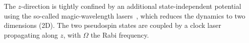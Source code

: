 \documentclass[twocolumn,english,prl,floatfix,citeautoscript,nofootinbib]{revtex4}
\begin{document}
The $z$-direction is tightly confined by an additional state-independent
potential using the so-called magic-wavelength lasers~\cite%
{RevModPhys.87.637}, which reduces the dynamics to two dimensions (2D).
The two pseudospin states
are coupled by a clock laser~\cite%
{RevModPhys.87.637} propagating along $z$, with $\Omega $ the Rabi
frequency.
\end{document}
